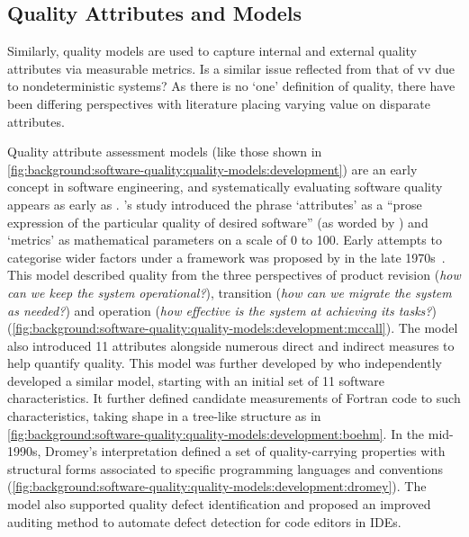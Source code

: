 \subsection{Quality Attributes and Models}
\label{ssec:background:software-quality:quality-models}

Similarly, quality models are used to capture internal and external quality attributes via measurable metrics. Is a similar issue reflected from that of \gls{vv} due to nondeterministic systems? As there is no `one' definition of quality, there have been differing perspectives with literature placing varying value on disparate attributes.



Quality attribute assessment models (like those shown in \cref{fig:background:software-quality:quality-models:development}) are an early concept in software engineering, and systematically evaluating software quality appears as early as \citeyear{Rubey:1968fg} \citep{Rubey:1968fg}. \citeauthor{Rubey:1968fg}'s \citeyear{Rubey:1968fg} study introduced the phrase `attributes' as a ``prose expression of the particular quality of desired software'' (as worded by \citet{Boehm:1978vv}) and `metrics' as mathematical parameters on a scale of 0 to 100. 
Early attempts to categorise wider factors under a framework was proposed by \citeauthor*{McCall:1977uy} in the late 1970s~\citep{McCall:1977wm,Cavano:1978gz}. This model described quality from the three perspectives of product revision (\textit{how can we keep the system operational?}), transition (\textit{how can we migrate the system as needed?}) and operation (\textit{how effective is the system at achieving its tasks?}) (\cref{fig:background:software-quality:quality-models:development:mccall}). The model also introduced 11 attributes alongside numerous direct and indirect measures to help quantify quality.
This model was further developed by \citet{Boehm:1978vv} who independently developed a similar model, starting with an initial set of 11 software characteristics. It further defined candidate measurements of Fortran code to such characteristics, taking shape in a tree-like structure as in \cref{fig:background:software-quality:quality-models:development:boehm}. 
In the mid-1990s, Dromey's interpretation \citep{Dromey:1995wy} defined a set of quality-carrying properties with structural forms associated to specific programming languages and conventions (\cref{fig:background:software-quality:quality-models:development:dromey}). The model also supported quality defect identification and proposed an improved auditing method to automate defect detection for code editors in IDEs. 
